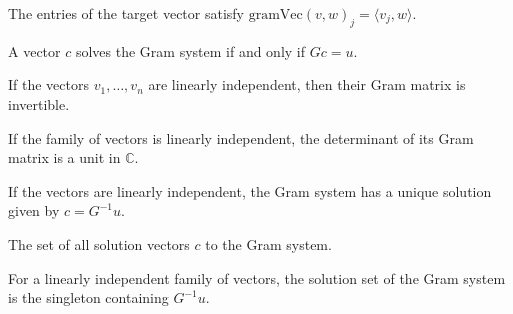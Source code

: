 \begin{theorem}\label{thm:gramVec_apply}
  \leanok
  The entries of the target vector satisfy $\text{gramVec}(v, w)_j = \langle v_j, w \rangle$.
\end{theorem}

\begin{theorem}\label{thm:isGramSolution_iff_mulVec}
  \leanok
  A vector $c$ solves the Gram system if and only if $G c = u$.
\end{theorem}

\begin{theorem}\label{thm:gramMatrix_det_ne_zero}
  \leanok
  If the vectors $v_1, \dots, v_n$ are linearly independent, then their Gram matrix is invertible.
\end{theorem}

\begin{theorem}\label{thm:gramMatrix_isUnit_det}
  \leanok
  If the family of vectors is linearly independent, the determinant of its Gram matrix is a unit in $\mathbb{C}$.
\end{theorem}

\begin{theorem}\label{thm:gram_solution_eq_inv}
  \leanok
  If the vectors are linearly independent, the Gram system has a unique solution given by $c = G^{-1} u$.
\end{theorem}

\begin{definition}\label{def:gramSolutionSet}
  \leanok
  The set of all solution vectors $c$ to the Gram system.
\end{definition}

\begin{theorem}\label{thm:gram_solutionSet_eq_singleton}
  \leanok
  For a linearly independent family of vectors, the solution set of the Gram system is the singleton containing $G^{-1} u$.
\end{theorem}

